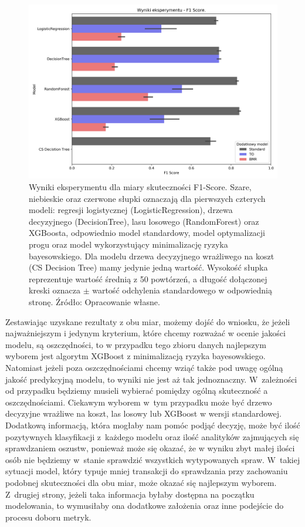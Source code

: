 \documentclass[inzynierska]{pwr_wmat_praca_dyplomowa}
\theoremstyle{plain}
\numberwithin{theorem}{chapter}
\theoremstyle{definition}
\numberwithin{theorem}{chapter}
\begin{document}
\begin{figure}[h]
	\includegraphics[width=\linewidth]{images/100_config1-F1.png}
	\caption{Wyniki eksperymentu dla miary skuteczności F1-Score. Szare, niebieskie oraz czerwone słupki oznaczają dla pierwszych czterych modeli: regresji logistycznej (LogisticRegression), drzewa decyzyjnego (DecisionTree), lasu losowego (RandomForest) oraz XGBoosta, odpowiednio model standardowy, model optymalizacji progu oraz model wykorzystujący minimalizację ryzyka bayesowskiego. Dla modelu drzewa decyzyjnego wrażliwego na koszt (CS Decision Tree) mamy jedynie jedną wartość. Wysokość słupka reprezentuje wartość średnią z 50 powtórzeń, a długość dołączonej kreski oznacza $\pm$ wartość odchylenia standardowego w odpowiednią stronę. Źródło: Opracowanie własne.}
	\label{fig:results-f1}
\end{figure}

Zestawiając uzyskane rezultaty z obu miar, możemy dojść do wniosku, że jeżeli najważniejszym i jedynym kryterium, które chcemy rozważać w ocenie jakości modelu, są oszczędności, to w przypadku tego zbioru danych najlepszym wyborem jest algorytm XGBoost z minimalizacją ryzyka bayesowskiego. Natomiast jeżeli poza oszczędnościami chcemy wziąć także pod uwagę ogólną jakość predykcyjną modelu, to wyniki nie jest aż tak jednoznaczny. W~zależności od przypadku będziemy musieli wybierać pomiędzy ogólną skuteczność a oszczędnościami. Ciekawym wyborem w~tym przypadku może być drzewo decyzyjne wrażliwe na koszt, las losowy lub XGBoost w wersji standardowej. Dodatkową informacją, która mogłaby nam pomóc podjąć decyzję, może być ilość pozytywnych klasyfikacji z~każdego modelu oraz ilość analityków zajmujących się sprawdzaniem oszustw, ponieważ może się okazać, że w wyniku zbyt małej ilości osób nie będziemy w~stanie sprawdzić wszystkich wytypowanych spraw. W~takiej sytuacji model, który typuje mniej transakcji do sprawdzania przy zachowaniu podobnej skuteczności dla obu miar, może okazać się najlepszym wyborem. Z~drugiej strony, jeżeli taka informacja byłaby dostępna na początku modelowania, to wymusiłaby ona dodatkowe założenia oraz inne podejście do procesu doboru metryk.
\end{document}
